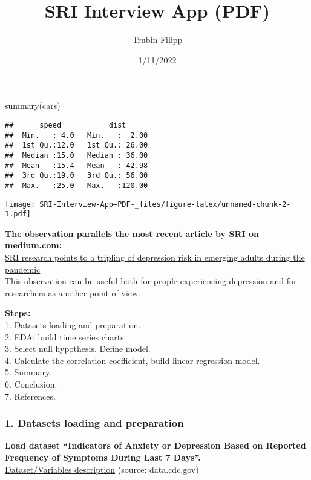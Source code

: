 \documentclass[
]{article}
\title{SRI Interview App (PDF)}
\author{Trubin Filipp}
\date{1/11/2022}
\newenvironment{Shaded}{\begin{snugshade}}{\end{snugshade}}
\newcommand{\FunctionTok}[1]{\textcolor[rgb]{0.00,0.00,0.00}{#1}}
\newcommand{\NormalTok}[1]{#1}
\begin{document}
\maketitle

\begin{Shaded}
\begin{Highlighting}[]
\FunctionTok{summary}\NormalTok{(cars)}
\end{Highlighting}
\end{Shaded}

\begin{verbatim}
##      speed           dist       
##  Min.   : 4.0   Min.   :  2.00  
##  1st Qu.:12.0   1st Qu.: 26.00  
##  Median :15.0   Median : 36.00  
##  Mean   :15.4   Mean   : 42.98  
##  3rd Qu.:19.0   3rd Qu.: 56.00  
##  Max.   :25.0   Max.   :120.00
\end{verbatim}

\texttt{[image: SRI-Interview-App--PDF-\_files/figure-latex/unnamed-chunk-2-1.pdf]}

\textbf{The observation parallels the most recent article by SRI on
medium.com:}\\
\href{https://medium.com/dish/sri-research-points-to-a-tripling-of-depression-risk-in-emerging-adults-during-the-pandemic-c39819c00946}{SRI
research points to a tripling of depression risk in emerging adults
during the pandemic}\\
This observation can be useful both for people experiencing depression
and for researchers as another point of view.

\textbf{Steps:}\\
1. Datasets loading and preparation.\\
2. EDA: build time series charts.\\
3. Select null hypothesis. Define model.\\
4. Calculate the correlation coefficient, build linear regression
model.\\
5. Summary.\\
6. Conclusion.\\
7. References.

\hypertarget{datasets-loading-and-preparation}{%
\subsubsection{1. Datasets loading and
preparation}\label{datasets-loading-and-preparation}}

\textbf{Load dataset ``Indicators of Anxiety or Depression Based on
Reported Frequency of Symptoms During Last 7 Days''.}\\
\href{https://data.cdc.gov/NCHS/Indicators-of-Anxiety-or-Depression-Based-on-Repor/8pt5-q6wp}{Dataset/Variables
description} (source: data.cdc.gov)
\end{document}

